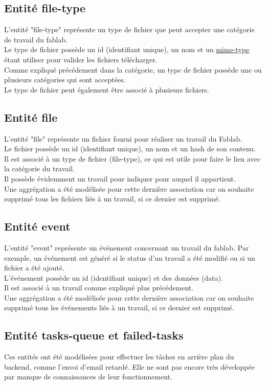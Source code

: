 \documentclass[
    iai, %
    il, %
]{heig-tb}
\begin{document}
\subsection{Entité file-type}
L'entité "file-type" représente un type de fichier que peut accepter une catégorie de travail du fablab.\\
Le type de fichier possède un id (identifiant unique), un nom et un \href{https://developer.mozilla.org/fr/docs/Web/HTTP/Basics_of_HTTP/MIME_Types}{mime-type} étant utiliser pour valider les fichiers télécharger.\\
Comme expliqué précédement dans la catégorie, un type de fichier possède une ou plusieurs catégories qui sont acceptées.\\
Le type de fichier peut également être associé à plusieurs fichiers.

\subsection{Entité file}
L'entité "file" représente un fichier fourni pour réaliser un travail du Fablab.\\
Le fichier possède un id (identifiant unique), un nom et un hash de son contenu.\\
Il est associé à un type de fichier (file-type), ce qui est utile pour faire le lien avec la catégorie du travail.\\
Il possède évidemment un travail pour indiquer pour auquel il appartient.\\
Une aggrégation a été modélisée pour cette dernière association car on souhaite supprimé tous les fichiers liés à un travail, si ce dernier est supprimé.

\subsection{Entité event}
L'entité "event" représente un événement concernant un travail du fablab. Par exemple, un événement est généré si le status d'un travail a été modifié ou si un fichier a été ajouté. \\
L'événement possède un id (identifiant unique) et des données (data).\\
Il est associé à un travail comme expliqué plus précédement.\\
Une aggrégation a été modélisée pour cette dernière association car on souhaite supprimé tous les événements liés à un travail, si ce dernier est supprimé.

\subsection{Entité tasks-queue et failed-tasks}
Ces entités ont été modélisées pour effectuer les tâches en arrière plan du backend, comme l'envoi d'email retardé. Elle ne sont pas encore très développée par manque de connaissances de leur fonctionnement.
\end{document}
